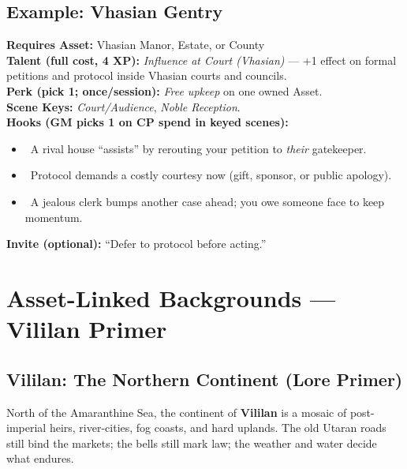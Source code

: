 \documentclass[11pt]{article}
\begin{document}
\subsection*{Example: Vhasian Gentry}
\textbf{Requires Asset:} Vhasian Manor, Estate, or County\\
\textbf{Talent (full cost, 4 XP):} \emph{Influence at Court (Vhasian)} — +1 effect on formal petitions and protocol inside Vhasian courts and councils.\\
\textbf{Perk (pick 1; once/session):} \emph{Free upkeep} on one owned Asset.\\
\textbf{Scene Keys:} \emph{Court/Audience}, \emph{Noble Reception}.\\[2pt]
\textbf{Hooks (GM picks 1 on CP spend in keyed scenes):}
\begin{itemize}
  \item \clubsuit~A rival house “assists” by rerouting your petition to \emph{their} gatekeeper.
  \item \diamondsuit~Protocol demands a costly courtesy now (gift, sponsor, or public apology).
  \item \heartsuit~A jealous clerk bumps another case ahead; you owe someone face to keep momentum.
\end{itemize}
\textbf{Invite (optional):} “Defer to protocol before acting.”


\section*{Asset-Linked Backgrounds — Vililan Primer}

\subsection*{Vililan: The Northern Continent (Lore Primer)}
North of the Amaranthine Sea, the continent of \textbf{Vililan} is a mosaic of post-imperial heirs, river-cities, fog coasts, and hard uplands. The old Utaran roads still bind the markets; the bells still mark law; the weather and water decide what endures.
\end{document}
